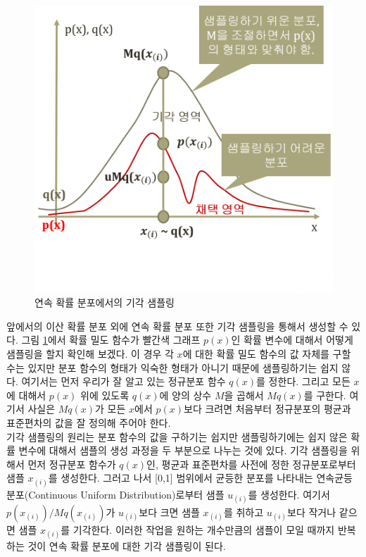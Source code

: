 \documentclass[a4paper]{oblivoir}
\begin{document}
\begin{figure}[ht] \centering 
\includegraphics[scale=0.45]{fig10_4.png} 
\caption{연속 확률 분포에서의 기각 샘플링}
\label{fig:10-4}
\end{figure}  

앞에서의 이산 확률 분포 외에 연속 확률 분포 또한 기각 샘플링을 통해서 생성할 수 있다. 그림 \ref{fig:10-4}에서 확률 밀도 함수가 빨간색 그래프 $p(x)$인 확률 변수에 대해서 어떻게 샘플링을 할지 확인해 보겠다. 이 경우 각 $x$에 대한 확률 밀도 함수의 값 자체를 구할 수는 있지만 분포 함수의 형태가 익숙한 형태가 아니기 때문에 샘플링하기는 쉽지 않다. 여기서는 먼저 우리가 잘 알고 있는 정규분포 함수 $q(x)$를 정한다. 그리고 모든 $x$에 대해서 $p(x)$ 위에 있도록 $q(x)$에 양의 상수 $M$을 곱해서 $Mq(x)$를 구한다. 여기서 사실은 $Mq(x)$가 모든 $x$에서 $p(x)$보다 크려면 처음부터 정규분포의 평균과 표준편차의 값을 잘 정의해 주어야 한다. \\

기각 샘플링의 원리는 분포 함수의 값을 구하기는 쉽지만 샘플링하기에는 쉽지 않은 확률 변수에 대해서 샘플의 생성 과정을 두 부분으로 나누는 것에 있다. 기각 샘플링을 위해서 먼저 정규분포 함수가 $q(x)$인, 평균과 표준편차를 사전에 정한 정규분포로부터 샘플 $x_{(i)}$를 생성한다. 그러고 나서 [0,1] 범위에서 균등한 분포를 나타내는 연속균등분포(Continuous Uniform Distribution)로부터 샘플 $u_{(i)}$를 생성한다. 여기서 $p(x_{(i)})/Mq(x_{(i)})$가 $u_{(i)}$보다 크면 샘플 $x_{(i)}$를 취하고 $u_{(i)}$보다 작거나 같으면 샘플 $x_{(i)}$를 기각한다. 이러한 작업을 원하는 개수만큼의 샘플이 모일 때까지 반복하는 것이 연속 확률 분포에 대한 기각 샘플링이 된다. \\  
\end{document}

